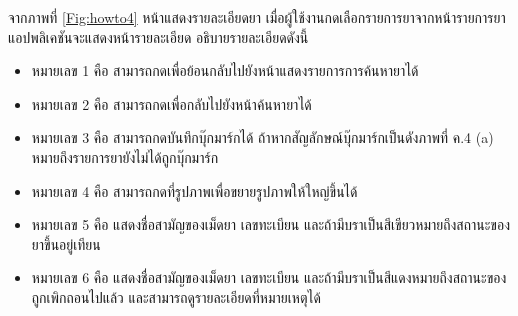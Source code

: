 จากภาพที่ \ref{Fig:howto4} หน้าแสดงรายละเอียดยา เมื่อผู้ใช้งานกดเลือกรายการยาจากหน้ารายการยา แอปพลิเคชันจะแสดงหน้ารายละเอียด อธิบายรายละเอียดดังนี้
\begin{itemize}[label={--}]
	\item หมายเลข 1 คือ สามารถกดเพื่อย้อนกลับไปยังหน้าแสดงรายการการค้นหายาได้
    \item หมายเลข 2 คือ สามารถกดเพื่อกลับไปยังหน้าค้นหายาได้
    \item หมายเลข 3 คือ สามารถกดบันทึกบุ๊กมาร์กได้ ถ้าหากสัญลักษณ์บุ๊กมาร์กเป็นดังภาพที่ ค.4 (a) หมายถึงรายการยายังไม่ได้ถูกบุ๊กมาร์ก
    \item หมายเลข 4 คือ สามารถกดที่รูปภาพเพื่อขยายรูปภาพให้ใหญ่ขึ้นได้
    \item หมายเลข 5 คือ แสดงชื่อสามัญของเม็ดยา เลขทะเบียน และถ้ามีบราเป็นสีเขียวหมายถึงสถานะของยาขึ้นอยู่เทียน
    \item หมายเลข 6 คือ แสดงชื่อสามัญของเม็ดยา เลขทะเบียน และถ้ามีบราเป็นสีแดงหมายถึงสถานะของถูกเพิกถอนไปแล้ว และสามารถดูรายละเอียดที่หมายเหตุได้
\end{itemize}

